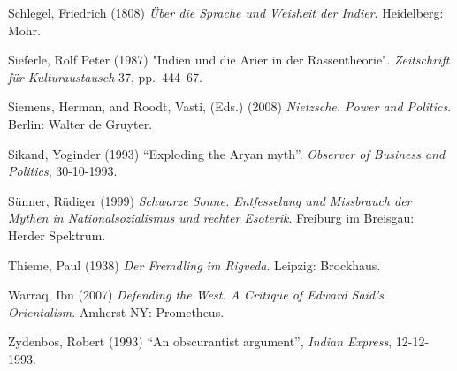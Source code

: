 \begin{thebibliography}{99}
Schlegel, Friedrich (1808) {\sl Über die Sprache und Weisheit der Indier}. Heidelberg: Mohr.

Sieferle, Rolf Peter (1987) "Indien und die Arier in der Rassentheorie". {\sl Zeitschrift für Kulturaustausch} 37, pp.~444--67.

Siemens, Herman, and Roodt, Vasti, (Eds.) (2008) {\sl Nietzsche. Power and Politics}. Berlin: Walter de Gruyter.

Sikand, Yoginder (1993) “Exploding the Aryan myth”. {\sl Observer of Business and Politics}, 30-10-1993.

Sünner, Rüdiger (1999) {\sl Schwarze Sonne. Entfesselung und Missbrauch der Mythen in Nationalsozialismus und rechter Esoterik}. Freiburg im Breisgau: Herder Spektrum.

Thieme, Paul (1938) {\sl Der Fremdling im Rigveda}. Leipzig: Brockhaus.

Warraq, Ibn (2007) {\sl Defending the West. A Critique of Edward Said’s Orientalism}. Amherst NY: Prometheus.

Zydenbos, Robert (1993) “An obscurantist argument”, {\sl Indian Express}, 12-12-1993.
\end{thebibliography}
